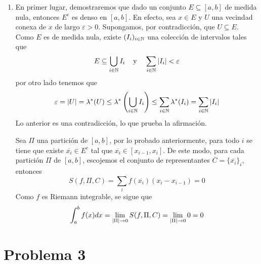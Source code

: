 \documentclass{article}
\begin{document}
\begin{enumerate}
    \item En primer lugar, demostraremos que dado un conjunto $E\subseteq[a,b]$ de medida nula, 
    entonces $E^{c}$ es denso en $[a,b]$. En efecto, sea $x\in E$ y $U$ una vecindad conexa de $x$ 
    de largo $\varepsilon>0$. Supongamos, por contradicción, que $U\subseteq E$. 
    Como $E$ es de medida nula, existe $(I_{i})_{i\in\mathbb{N}}$ una colección de intervalos tales que
    \begin{equation*}
        E\subseteq\bigcup_{i\in\mathbb{N}}I_{i}\hspace{4mm}\text{y}\hspace{4mm}
        \sum_{i\in\mathbb{N}}\left|I_{i} \right|<\varepsilon
    \end{equation*}
    por otro lado tenemos que
    \begin{equation*}
        \varepsilon=\left|U \right|=\lambda^{*}(U)\leq\lambda^{*}\left(\bigcup_{i\in\mathbb{N}}I_{i}\right)\leq
        \sum_{i\in\mathbb{N}}\lambda^{*}(I_{i})=\sum_{i\in\mathbb{N}}\left|I_{i} \right|
    \end{equation*}
    Lo anterior es una contradicción, lo que prueba la afirmación.
    \vspace{4mm}

    \noindent Sea $\Pi$ una partición de $[a,b]$, por lo probado anteriormente, para todo $i$ se
    tiene que existe $\overline{x_{i}}\in E^{c}$ tal que $\overline{x_{i}}\in[x_{i-1},x_{i}]$. De
    este modo, para cada partición $\Pi$ de $[a,b]$, escojemos el conjunto de representantes 
    $\overline{C}=\{\overline{x_{i}}\}_{i}$, entonces
    \begin{equation*}
        S(f,\Pi,C)=\sum_{i}f(\overline{x_{i}})(x_{i}-x_{i-1})=0
    \end{equation*}
    Como $f$ es Riemann integrable, se sigue que
    \begin{equation*}
        \int_{a}^{b}f(x)dx=\lim_{\left|\Pi \right|\to0}S(f,\Pi,C)=\lim_{\left|\Pi \right|\to0}0=0
    \end{equation*}
\end{enumerate}

\section*{Problema 3}
\end{document}
